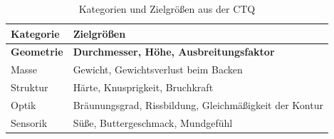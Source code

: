 \begin{table}[h!]
\centering
\caption{Kategorien und Zielgrößen aus der CTQ}
\label{table:zielgroeßen}
\begin{tabular}{|l|l|}
\hline
Kategorie  & Zielgrößen  \\
\hline
\textbf{Geometrie}  & \textbf{Durchmesser, Höhe, Ausbreitungsfaktor}\\
Masse  & Gewicht, Gewichtsverlust beim Backen \\
Struktur  & Härte, Knusprigkeit, Bruchkraft \\
Optik  & Bräunungsgrad, Rissbildung, Gleichmäßigkeit der Kontur \\
Sensorik  & Süße, Buttergeschmack, Mundgefühl \\
\hline
\end{tabular}
\end{table}